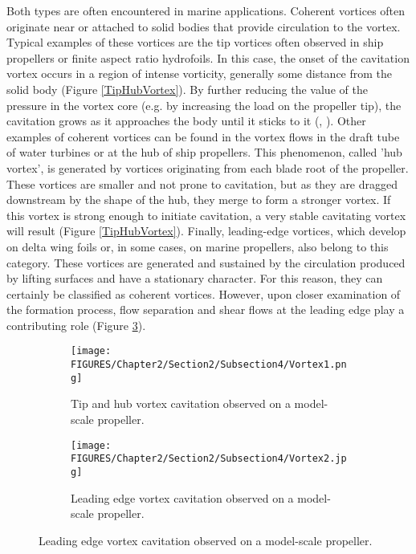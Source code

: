 Both types are often encountered in marine applications. 
Coherent vortices often originate near or attached to solid bodies that provide circulation to the vortex.
Typical examples of these vortices are the tip vortices often observed in ship propellers or finite aspect ratio hydrofoils. In this case, the onset of the cavitation vortex occurs in a region of intense vorticity, generally some distance from the solid body (Figure \ref{TipHubVortex}).
By further reducing the value of the pressure in the vortex core (e.g. by increasing the load on the propeller tip), the cavitation grows as it approaches the body until it sticks to it (\cite{carlton2018marine}, \cite{brennen2014cavitation}).
Other examples of coherent vortices can be found in the vortex flows in the draft tube of water turbines or at the hub of ship propellers. This phenomenon, called 'hub vortex', is generated by vortices originating from each blade root of the propeller. These vortices are smaller and not prone to cavitation, but as they are dragged downstream by the shape of the hub, they merge to form a stronger vortex.
If this vortex is strong enough to initiate cavitation, a very stable cavitating vortex will result (Figure \ref{TipHubVortex}). 
Finally, leading-edge vortices, which develop on delta wing foils or, in some cases, on marine propellers, also belong to this category. These vortices are generated and sustained by the circulation produced by lifting surfaces and have a stationary character. For this reason, they can certainly be classified as coherent vortices. However, upon closer examination of the formation process, flow separation and shear flows at the leading edge play a contributing role (Figure \ref{fig:LeadingVortex}).

\begin{figure}[htbp]
    \centering
    \begin{subfigure}[b]{0.47\textwidth}
        \centering
        \texttt{[image: FIGURES/Chapter2/Section2/Subsection4/Vortex1.png]}
        \caption{Tip and hub vortex cavitation observed on a model-scale propeller.}
        \label{fig:TipHubVortex}
    \end{subfigure}
    \hfill
    \begin{subfigure}[b]{0.47\textwidth}
        \centering
        \texttt{[image: FIGURES/Chapter2/Section2/Subsection4/Vortex2.jpg]}
        \caption{Leading edge vortex cavitation observed on a model-scale propeller.}
        \label{fig:LeadingVortex}
    \end{subfigure}
\end{figure}

